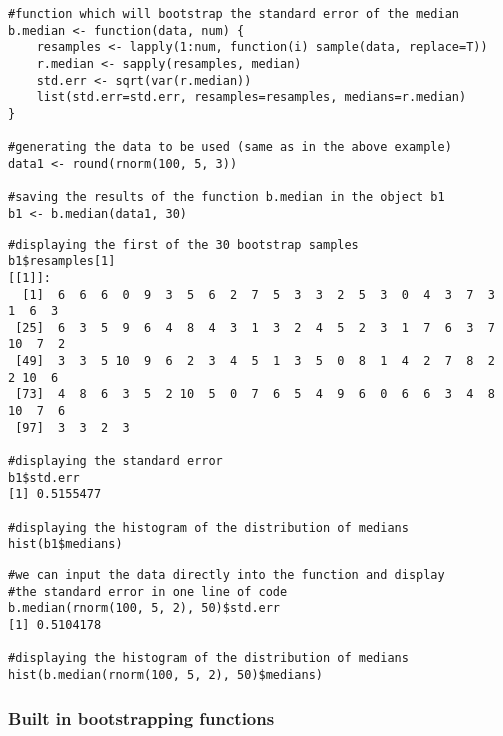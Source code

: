 \documentclass[12pt]{article}
\begin{document}
\begin{framed}
\begin{verbatim}
#function which will bootstrap the standard error of the median
b.median <- function(data, num) {
    resamples <- lapply(1:num, function(i) sample(data, replace=T))
    r.median <- sapply(resamples, median)
    std.err <- sqrt(var(r.median))
    list(std.err=std.err, resamples=resamples, medians=r.median)   
}

#generating the data to be used (same as in the above example)
data1 <- round(rnorm(100, 5, 3))

#saving the results of the function b.median in the object b1
b1 <- b.median(data1, 30)
\end{verbatim}
\end{framed} 
\begin{framed}
\begin{verbatim}
#displaying the first of the 30 bootstrap samples
b1$resamples[1]
[[1]]:
  [1]  6  6  6  0  9  3  5  6  2  7  5  3  3  2  5  3  0  4  3  7  3  1  6  3
 [25]  6  3  5  9  6  4  8  4  3  1  3  2  4  5  2  3  1  7  6  3  7 10  7  2
 [49]  3  3  5 10  9  6  2  3  4  5  1  3  5  0  8  1  4  2  7  8  2  2 10  6
 [73]  4  8  6  3  5  2 10  5  0  7  6  5  4  9  6  0  6  6  3  4  8 10  7  6
 [97]  3  3  2  3

#displaying the standard error
b1$std.err
[1] 0.5155477

#displaying the histogram of the distribution of medians
hist(b1$medians)
\end{verbatim}
\end{framed} 


\begin{framed}
\begin{verbatim}
#we can input the data directly into the function and display 
#the standard error in one line of code
b.median(rnorm(100, 5, 2), 50)$std.err
[1] 0.5104178

#displaying the histogram of the distribution of medians
hist(b.median(rnorm(100, 5, 2), 50)$medians)
\end{verbatim}
\end{framed} 



\subsubsection*{Built in bootstrapping functions}
\end{document}
